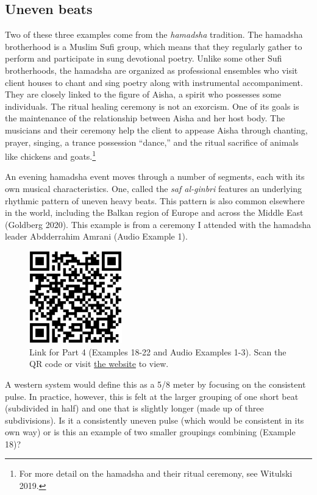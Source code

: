 \documentclass[twoside]{article}
\providecommand{\wmturlcaption}{
  Scan the QR code or visit \href{https://worldmusictextbook.org/witulski-2021}{the website} to view.
}
\begin{document}
\hypertarget{uneven-beats}{%
\subsection*{Uneven beats}\label{uneven-beats}}

Two of these three examples come from the \emph{hamadsha} tradition. The
hamadsha brotherhood is a Muslim Sufi group, which means that they
regularly gather to perform and participate in sung devotional poetry.
Unlike some other Sufi brotherhoods, the hamadsha are organized as
professional ensembles who visit client houses to chant and sing poetry
along with instrumental accompaniment. They are closely linked to the
figure of Aisha, a spirit who possesses some individuals. The ritual
healing ceremony is not an exorcism. One of its goals is the maintenance
of the relationship between Aisha and her host body. The musicians and
their ceremony help the client to appease Aisha through chanting,
prayer, singing, a trance possession ``dance,'' and the ritual sacrifice
of animals like chickens and goats.\footnote{For more detail on the
  hamadsha and their ritual ceremony, see Witulski 2019.}

An evening hamadsha event moves through a number of segments, each with
its own musical characteristics. One, called the \emph{saf al-ginbri}
features an underlying rhythmic pattern of uneven heavy beats. This
pattern is also common elsewhere in the world, including the Balkan
region of Europe and across the Middle East (Goldberg 2020). This
example is from a ceremony I attended with the hamadsha leader
Abdderrahim Amrani (Audio Example 1).

\begin{figure}
  \centering
  \includegraphics[height=4cm]{witulski-rhythm-part-4.png}
  \caption*{Link for Part 4 (Examples 18-22 and Audio Examples 1-3). \wmturlcaption}
\end{figure}

A western system would define this as a 5/8 meter by focusing on the
consistent pulse. In practice, however, this is felt at the larger
grouping of one short beat (subdivided in half) and one that is slightly
longer (made up of three subdivisions). Is it a consistently uneven
pulse (which would be consistent in its own way) or is this an example
of two smaller groupings combining (Example 18)?
\end{document}
